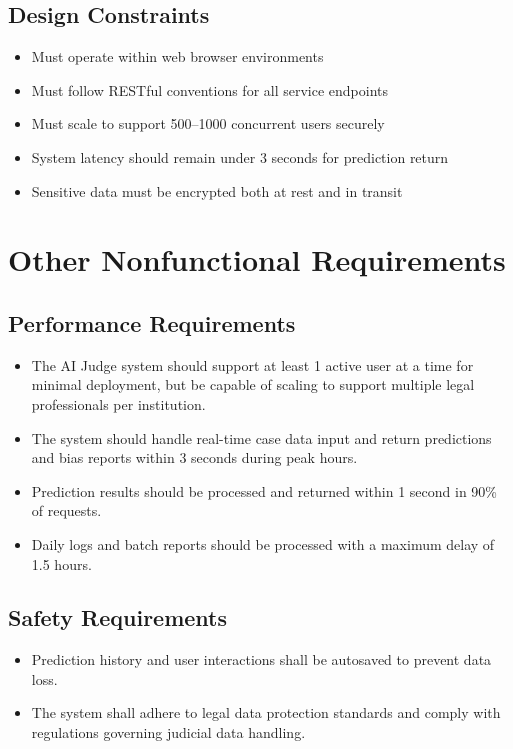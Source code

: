 \documentclass[12pt]{article}
\begin{document}
\subsection{Design Constraints}
\begin{itemize}
    \item Must operate within web browser environments
    \item Must follow RESTful conventions for all service endpoints
    \item Must scale to support 500–1000 concurrent users securely
    \item System latency should remain under 3 seconds for prediction return
    \item Sensitive data must be encrypted both at rest and in transit
\end{itemize}

\section{Other Nonfunctional Requirements}

\subsection{Performance Requirements}
\begin{itemize}
    \item The AI Judge system should support at least 1 active user at a time for minimal deployment, but be capable of scaling to support multiple legal professionals per institution.
    \item The system should handle real-time case data input and return predictions and bias reports within 3 seconds during peak hours.
    \item Prediction results should be processed and returned within 1 second in 90\% of requests.
    \item Daily logs and batch reports should be processed with a maximum delay of 1.5 hours.
\end{itemize}

\subsection{Safety Requirements}
\begin{itemize}
    \item Prediction history and user interactions shall be autosaved to prevent data loss.
    \item The system shall adhere to legal data protection standards and comply with regulations governing judicial data handling.
\end{itemize}
\end{document}
